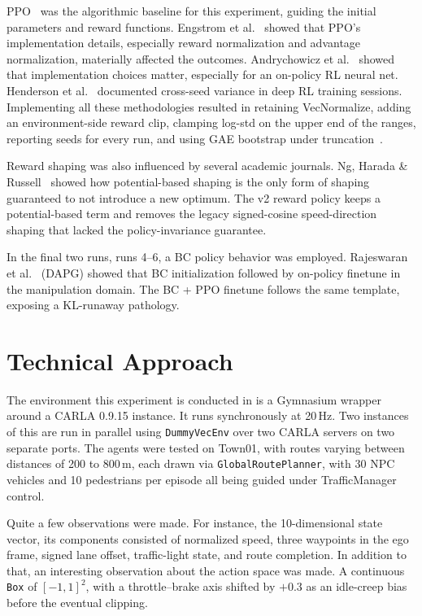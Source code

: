 \documentclass[conference]{IEEEtran}
\begin{document}
PPO~\cite{ppo} was the algorithmic baseline for this
experiment, guiding the initial parameters and reward
functions. Engstrom et al.~\cite{engstrom} showed that PPO's
implementation details, especially reward normalization and
advantage normalization, materially affected the outcomes.
Andrychowicz et al.~\cite{andrychowicz} showed that
implementation choices matter, especially for an on-policy
RL neural net. Henderson et al.~\cite{henderson} documented
cross-seed variance in deep RL training sessions.
Implementing all these methodologies resulted in retaining
VecNormalize, adding an environment-side reward clip,
clamping log-std on the upper end of the ranges, reporting
seeds for every run, and using GAE bootstrap under
truncation~\cite{pardo}.

Reward shaping was also influenced by several academic
journals. Ng, Harada \& Russell~\cite{ng} showed how
potential-based shaping is the only form of shaping
guaranteed to not introduce a new optimum. The v2 reward
policy keeps a potential-based term and removes the legacy
signed-cosine speed-direction shaping that lacked the
policy-invariance guarantee.

In the final two runs, runs 4--6, a BC policy behavior was
employed. Rajeswaran et al.~\cite{dapg} (DAPG) showed that
BC initialization followed by on-policy finetune in the
manipulation domain. The BC + PPO finetune follows the same
template, exposing a KL-runaway pathology.

\section{Technical Approach}

The environment this experiment is conducted in is a
Gymnasium wrapper around a CARLA 0.9.15 instance. It runs
synchronously at 20\,Hz. Two instances of this are run in
parallel using \texttt{DummyVecEnv} over two CARLA servers
on two separate ports. The agents were tested on Town01,
with routes varying between distances of 200 to 800\,m,
each drawn via \texttt{GlobalRoutePlanner}, with 30 NPC
vehicles and 10 pedestrians per episode all being guided
under TrafficManager control.

Quite a few observations were made. For instance, the
10-dimensional state vector, its components consisted of
normalized speed, three waypoints in the ego frame, signed
lane offset, traffic-light state, and route completion. In
addition to that, an interesting observation about the
action space was made. A continuous \texttt{Box} of
$[-1, 1]^2$, with a throttle--brake axis shifted by
$+0.3$ as an idle-creep bias before the eventual clipping.
\end{document}

